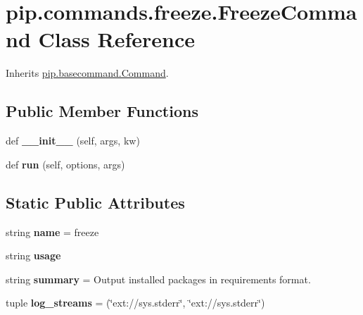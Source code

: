 \hypertarget{classpip_1_1commands_1_1freeze_1_1_freeze_command}{}\section{pip.\+commands.\+freeze.\+Freeze\+Command Class Reference}
\label{classpip_1_1commands_1_1freeze_1_1_freeze_command}


Inherits \hyperlink{classpip_1_1basecommand_1_1_command}{pip.\+basecommand.\+Command}.

\subsection*{Public Member Functions}
\begin{DoxyCompactItemize}
\item 
\mbox{\label{classpip_1_1commands_1_1freeze_1_1_freeze_command_a3d4a88152aa390368228412e6a2eaedc}} 
def {\bfseries \+\_\+\+\_\+init\+\_\+\+\_\+} (self, args, kw)
\item 
\mbox{\label{classpip_1_1commands_1_1freeze_1_1_freeze_command_ad5e0de21924d330f23eedcabda768b19}} 
def {\bfseries run} (self, options, args)
\end{DoxyCompactItemize}
\subsection*{Static Public Attributes}
\begin{DoxyCompactItemize}
\item 
\mbox{\label{classpip_1_1commands_1_1freeze_1_1_freeze_command_a46027ae32e2614c0b02bb0a4c956035d}} 
string {\bfseries name} = \textquotesingle{}freeze\textquotesingle{}
\item 
string {\bfseries usage}
\item 
\mbox{\label{classpip_1_1commands_1_1freeze_1_1_freeze_command_ac6b4515fd824a4f222d14e6445f70277}} 
string {\bfseries summary} = \textquotesingle{}Output installed packages in requirements format.\textquotesingle{}
\item 
\mbox{\label{classpip_1_1commands_1_1freeze_1_1_freeze_command_a986ce3ddbb3ba418095f70b627fd1c0c}} 
tuple {\bfseries log\+\_\+streams} = (\char`\"{}ext\+://sys.\+stderr\char`\"{}, \char`\"{}ext\+://sys.\+stderr\char`\"{})
\end{DoxyCompactItemize}
